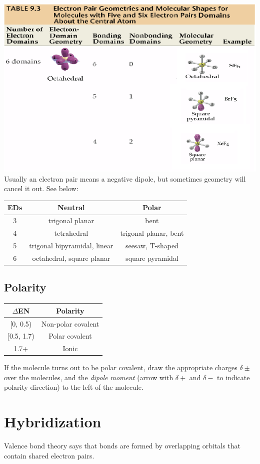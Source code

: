 \documentclass[a4paper, 8pt]{memoir}
\begin{document}
\includegraphics[scale=0.4]{molgeo6} \\

Usually an electron pair means a negative dipole, but sometimes geometry will cancel it out. See below:

\begin{tabular}{|c|c|c|}
\hline
EDs & Neutral & Polar \\ \hline
3 & trigonal planar & bent \\ \hline
4 & tetrahedral & trigonal planar, bent \\ \hline
5 & trigonal bipyramidal, linear & seesaw, T-shaped \\ \hline
6 & octahedral, square planar & square pyramidal\\ \hline
\end{tabular}
\section{Polarity}
\begin{tabular}{|c|c|}
\hline
$\Delta$EN & Polarity \\ \hline
[0, 0.5) & Non-polar covalent \\ \hline
[0.5, 1.7) & Polar covalent \\ \hline
1.7+ & Ionic \\ \hline
\end{tabular}

If the molecule turns out to be polar covalent, draw the appropriate charges $\delta\pm$ over the molecules, and the \emph{dipole moment} (arrow with $\delta+$ and $\delta-$ to indicate polarity direction) to the left of the molecule.
\chapter{Hybridization}
Valence bond theory says that bonds are formed by overlapping orbitals that contain shared electron pairs.
\end{document}
